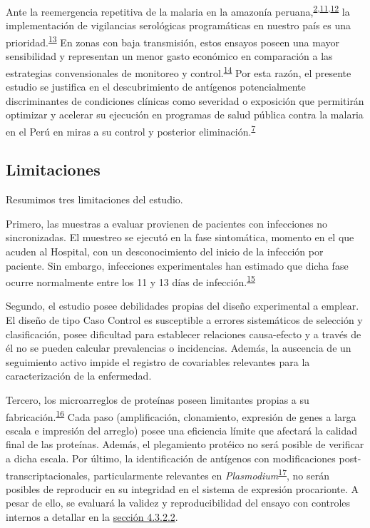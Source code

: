 \documentclass[]{article}
\begin{document}
Ante la reemergencia repetitiva de la malaria en la amazonía
peruana,\textsuperscript{\protect\hyperlink{ref-rosas2016peru}{2},\protect\hyperlink{ref-griffing2013history}{11},\protect\hyperlink{ref-soto2017spatio}{12}}
la implementación de vigilancias serológicas programáticas en nuestro
país es una
prioridad.\textsuperscript{\protect\hyperlink{ref-hotspots2015}{13}} En
zonas con baja transmisión, estos ensayos poseen una mayor sensibilidad
y representan un menor gasto económico en comparación a las estrategias
convensionales de monitoreo y
control.\textsuperscript{\protect\hyperlink{ref-elliott2014}{14}} Por
esta razón, el presente estudio se justifica en el descubrimiento de
antígenos potencialmente discriminantes de condiciones clínicas como
severidad o exposición que permitirán optimizar y acelerar su ejecución
en programas de salud pública contra la malaria en el Perú en miras a su
control y posterior
eliminación.\textsuperscript{\protect\hyperlink{ref-accelerate2016}{7}}

\subsection{Limitaciones}\label{limit}

Resumimos tres limitaciones del estudio.

Primero, las muestras a evaluar provienen de pacientes con infecciones
no sincronizadas. El muestreo se ejecutó en la fase sintomática, momento
en el que acuden al Hospital, con un desconocimiento del inicio de la
infección por paciente. Sin embargo, infecciones experimentales han
estimado que dicha fase ocurre normalmente entre los 11 y 13 días de
infección.\textsuperscript{\protect\hyperlink{ref-arevalo2014}{15}}

Segundo, el estudio posee debilidades propias del diseño experimental a
emplear. El diseño de tipo Caso Control es susceptible a errores
sistemáticos de selección y clasificación, posee dificultad para
establecer relaciones causa-efecto y a través de él no se pueden
calcular prevalencias o incidencias. Además, la auscencia de un
seguimiento activo impide el registro de covariables relevantes para la
caracterización de la enfermedad.

Tercero, los microarreglos de proteínas poseen limitantes propias a su
fabricación.\textsuperscript{\protect\hyperlink{ref-vigil2010}{16}} Cada
paso (amplificación, clonamiento, expresión de genes a larga escala e
impresión del arreglo) posee una eficiencia límite que afectará la
calidad final de las proteínas. Además, el plegamiento protéico no será
posible de verificar a dicha escala. Por último, la identificación de
antígenos con modificaciones post-transcriptacionales, particularmente
relevantes en
\emph{Plasmodium}\textsuperscript{\protect\hyperlink{ref-leroch2009postmod}{17}},
no serán posibles de reproducir en su integridad en el sistema de
expresión procarionte. A pesar de ello, se evaluará la validez y
reproducibilidad del ensayo con controles internos a detallar en la
\protect\hyperlink{validez}{sección 4.3.2.2}.
\end{document}
